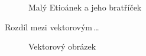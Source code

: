 \documentclass[11pt, a4paper, czech]{article}
\begin{document}
\begin{figure}[h]
\begin{center}
		\caption{Malý Etioánek a jeho bratříček}
		\label{obrazek1}
	\end{center}
\end{figure}

\newpage
Rozdíl mezi vektorovým\,\dots 
\begin{figure}[h]
	\begin{center}
		\caption{Vektorový obrázek}
		\label{obrazek2}
	\end{center}
\end{figure}
\end{document}
